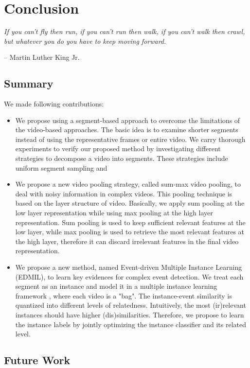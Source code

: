 \chapter{Conclusion}
\label{chapter6}

\epigraph{\textit{If you can't fly then run, if you can't run then walk, if you can't walk then crawl, but whatever you do you have to keep moving forward.}}{ -- Martin Luther King Jr.}

\ifpdf
    \graphicspath{{Chapter6/Figs/Raster/}{Chapter6/Figs/PDF/}{Chapter6/Figs/}}
\else
    \graphicspath{{Chapter6/Figs/Vector/}{Chapter6/Figs/}}
\fi

\section{Summary}

We made following contributions:

\begin{itemize}
	\item We propose using a segment-based approach to overcome the limitations of  the video-based approaches. The basic idea is to examine shorter segments instead of using the representative frames or entire video. We carry thorough experiments to verify our proposed method by investigating different strategies to decompose a video into segments. These strategies include uniform segment sampling and 
	
	\item We propose a new video pooling strategy, called sum-max video pooling, to deal with noisy information in complex videos. This pooling technique is based on the layer structure of video. Basically, we apply sum pooling at the low layer representation while using max pooling at the high layer representation. Sum pooling is used to keep sufficient relevant features at the low layer, while max pooling is used to retrieve the most relevant features at the high layer, therefore it can discard irrelevant features in the final video representation. 
	
	\item We propose a new method, named Event-driven Multiple Instance Learning (EDMIL), to learn key evidences for complex event detection. We treat each segment as an instance and model it in a multiple instance learning framework \cite{andrews2002support}, where each video is a "bag". The instance-event similarity is quantized into different levels of relatedness. Intuitively, the most (ir)relevant instances should have higher (dis)similarities. Therefore, we propose to learn the instance labels by jointly optimizing the instance classifier and its related level.	
	
\end{itemize}
	
\section{Future Work}

